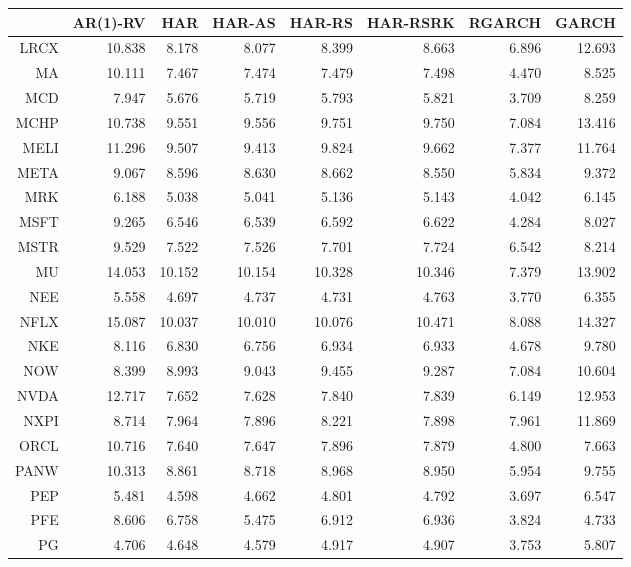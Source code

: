 \begin{table}[ht]
\centering
\begin{tabular}{rrrrrrrr}
  \hline
 & AR(1)-RV & HAR & HAR-AS & HAR-RS & HAR-RSRK & RGARCH & GARCH \\ 
  \hline
LRCX & 10.838 & 8.178 & 8.077 & 8.399 & 8.663 & 6.896 & 12.693 \\ 
  MA & 10.111 & 7.467 & 7.474 & 7.479 & 7.498 & 4.470 & 8.525 \\ 
  MCD & 7.947 & 5.676 & 5.719 & 5.793 & 5.821 & 3.709 & 8.259 \\ 
  MCHP & 10.738 & 9.551 & 9.556 & 9.751 & 9.750 & 7.084 & 13.416 \\ 
  MELI & 11.296 & 9.507 & 9.413 & 9.824 & 9.662 & 7.377 & 11.764 \\ 
  META & 9.067 & 8.596 & 8.630 & 8.662 & 8.550 & 5.834 & 9.372 \\ 
  MRK & 6.188 & 5.038 & 5.041 & 5.136 & 5.143 & 4.042 & 6.145 \\ 
  MSFT & 9.265 & 6.546 & 6.539 & 6.592 & 6.622 & 4.284 & 8.027 \\ 
  MSTR & 9.529 & 7.522 & 7.526 & 7.701 & 7.724 & 6.542 & 8.214 \\ 
  MU & 14.053 & 10.152 & 10.154 & 10.328 & 10.346 & 7.379 & 13.902 \\ 
  NEE & 5.558 & 4.697 & 4.737 & 4.731 & 4.763 & 3.770 & 6.355 \\ 
  NFLX & 15.087 & 10.037 & 10.010 & 10.076 & 10.471 & 8.088 & 14.327 \\ 
  NKE & 8.116 & 6.830 & 6.756 & 6.934 & 6.933 & 4.678 & 9.780 \\ 
  NOW & 8.399 & 8.993 & 9.043 & 9.455 & 9.287 & 7.084 & 10.604 \\ 
  NVDA & 12.717 & 7.652 & 7.628 & 7.840 & 7.839 & 6.149 & 12.953 \\ 
  NXPI & 8.714 & 7.964 & 7.896 & 8.221 & 7.898 & 7.961 & 11.869 \\ 
  ORCL & 10.716 & 7.640 & 7.647 & 7.896 & 7.879 & 4.800 & 7.663 \\ 
  PANW & 10.313 & 8.861 & 8.718 & 8.968 & 8.950 & 5.954 & 9.755 \\ 
  PEP & 5.481 & 4.598 & 4.662 & 4.801 & 4.792 & 3.697 & 6.547 \\ 
  PFE & 8.606 & 6.758 & 5.475 & 6.912 & 6.936 & 3.824 & 4.733 \\ 
  PG & 4.706 & 4.648 & 4.579 & 4.917 & 4.907 & 3.753 & 5.807 \\ 

\end{tabular}
\end{table}
